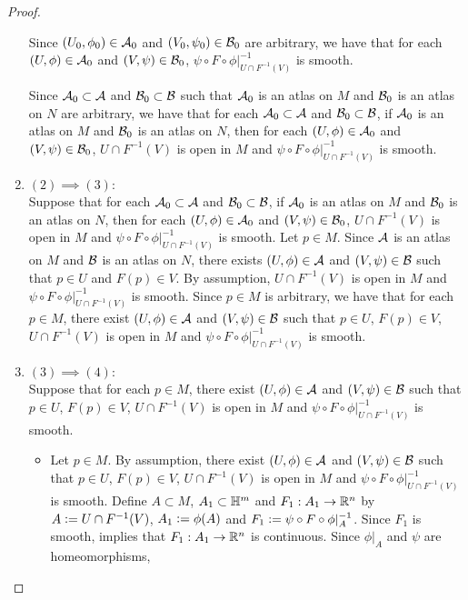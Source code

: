 \documentclass{book}
\begin{document}
\begin{proof}
\begin{enumerate}
		Since $(U_0, \phi_0) \in \mathcal{A}_0$ and $(V_0, \psi_0) \in \mathcal{B}_0$ are arbitrary, we have that for each $(U, \phi) \in \mathcal{A}_0$ and $(V, \psi) \in \mathcal{B}_0$, $\psi \circ F \circ \phi|_{U \cap F^{-1}(V)}^{-1}$ is smooth. 
		
		Since $\mathcal{A}_0 \subset \mathcal{A}$ and $\mathcal{B}_0 \subset \mathcal{B}$ such that $\mathcal{A}_0$ is an atlas on $M$ and $\mathcal{B}_0$ is an atlas on $N$ are arbitrary, we have that for each $\mathcal{A}_0 \subset \mathcal{A}$ and $\mathcal{B}_0 \subset \mathcal{B}$, if $\mathcal{A}_0$ is an atlas on $M$ and $\mathcal{B}_0$ is an atlas on $N$, then for each $(U, \phi) \in \mathcal{A}_0$ and $(V, \psi) \in \mathcal{B}_0$, $U \cap F^{-1}(V)$ is open in $M$ and $\psi \circ F \circ \phi|_{U \cap F^{-1}(V)}^{-1}$ is smooth.
		\item $(2) \implies (3)$: \\
		Suppose that for each $\mathcal{A}_0 \subset \mathcal{A}$ and $\mathcal{B}_0 \subset \mathcal{B}$, if $\mathcal{A}_0$ is an atlas on $M$ and $\mathcal{B}_0$ is an atlas on $N$, then for each $(U, \phi) \in \mathcal{A}_0$ and $(V, \psi) \in \mathcal{B}_0$, $U \cap F^{-1}(V)$ is open in $M$ and $\psi \circ F \circ \phi|_{U \cap F^{-1}(V)}^{-1}$ is smooth. Let $p \in M$. Since $\mathcal{A}$ is an atlas on $M$ and $\mathcal{B}$ is an atlas on $N$, there exists $(U, \phi) \in \mathcal{A}$ and $(V, \psi) \in \mathcal{B}$ such that $p \in U$ and $F(p) \in V$. By assumption, $U \cap F^{-1}(V)$ is open in $M$ and $\psi \circ F \circ \phi|_{U \cap F^{-1}(V)}^{-1}$ is smooth. Since $p \in M$ is arbitrary, we have that for each $p \in M$, there exist $(U, \phi) \in \mathcal{A}$ and $(V, \psi) \in \mathcal{B}$ such that $p \in U$, $F(p) \in V$, $U \cap F^{-1}(V)$ is open in $M$ and $\psi \circ F \circ \phi|_{U \cap F^{-1}(V)}^{-1}$ is smooth. 
		\item $(3) \implies (4)$: \\
		Suppose that for each $p \in M$, there exist $(U, \phi) \in \mathcal{A}$ and $(V, \psi) \in \mathcal{B}$ such that $p \in U$, $F(p) \in V$, $U \cap F^{-1}(V)$ is open in $M$ and $\psi \circ F \circ \phi|_{U \cap F^{-1}(V)}^{-1}$ is smooth. 
		\begin{itemize}
			\item Let $p \in M$. By assumption, there exist $(U, \phi) \in \mathcal{A}$ and $(V, \psi) \in \mathcal{B}$ such that $p \in U$, $F(p) \in V$, $U \cap F^{-1}(V)$ is open in $M$ and $\psi \circ F \circ \phi|_{U \cap F^{-1}(V)}^{-1}$ is smooth. Define $A \subset M$, $A_1 \subset \mathbb{H}^m$ and $F_1: A_1 \rightarrow \mathbb{R}^n$ by $A \vcentcolon= U \cap F^{-1}(V)$, $A_1 \vcentcolon= \phi(A)$ and $F_1 \vcentcolon= \psi \circ F \circ \phi|_{A}^{-1}$. Since $F_1$ is smooth,  implies that $F_1:A_1 \rightarrow \mathbb{R}^n$ is continuous. Since $\phi|_{A}$ and $\psi$ are homeomorphisms, 

\end{itemize}
\end{enumerate}
\end{proof}
\end{document}
